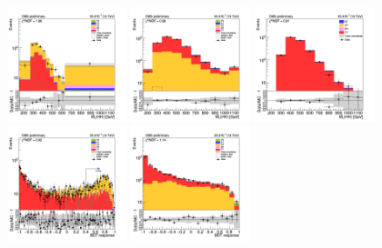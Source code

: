 \begin{figure}[tbp]
\begin{center}
    \includegraphics[width=0.31\textwidth]{figures/ee_300_july20/hhMt_ee_SR_FullPostfit_plot_july20.png}
    \includegraphics[width=0.31\textwidth]{figures/ee_300_july20/hhMt_ee_CRDY_FullPostfit_plot_july20.png}
    \includegraphics[width=0.31\textwidth]{figures/ee_300_july20/hhMt_ee_CRTT_FullPostfit_plot_july20.png}\\
    \includegraphics[width=0.31\textwidth]{figures/ee_300_july20/bdt_response_ee_SR_FullPostfit_plot_july20.png}
    \includegraphics[width=0.31\textwidth]{figures/ee_300_july20/bdt_response_ee_CRDY_FullPostfit_plot_july20.png}

\end{center}
\end{figure}
